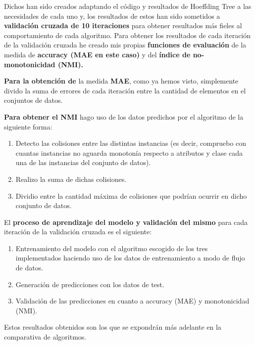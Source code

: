 Dichos han sido creados adaptando el código y resultados de Hoeffding Tree a las necesidades de cada uno y, los resultados de estos han sido sometidos a\textbf{ validación cruzada de 10 iteraciones} para obtener resultados más fieles al comportamiento de cada algoritmo. Para obtener los resultados de cada iteración de la validación cruzada he creado mis propias\textbf{ funciones de evaluación} de la medida de \textbf{accuracy (MAE en este caso)} y del \textbf{índice de no-monotonicidad (NMI).}

\textbf{Para la obtención de} la medida \textbf{MAE}, como ya hemos visto, simplemente divido la suma de errores de cada iteración entre la cantidad de elementos en el conjuntos de datos. 

\textbf{Para obtener el NMI} hago uso de los datos predichos por el algoritmo de la siguiente forma:
\begin{enumerate}
	\item Detecto las colisiones entre las distintas instancias (es decir, compruebo con cuantas instancias no aguarda monotonía respecto a atributos y clase cada una de las instancias del conjunto de datos).
	\item Realizo la suma de dichas colisiones.
	\item Dividio entre la cantidad máxima de colisiones que podrían ocurrir en dicho conjunto de datos.
\end{enumerate}

El \textbf{proceso de aprendizaje del modelo y validación del mismo} para cada iteración de la validación cruzada es el siguiente:
\begin{enumerate}
	\item Entrenamiento del modelo con el algoritmo escogido de los tres implementados haciendo uso de los datos de entrenamiento a modo de flujo de datos.
	\item Generación de predicciones con los datos de test.
	\item Validación de las predicciones en cuanto a accuracy (MAE) y monotonicidad (NMI).
\end{enumerate}

Estos resultados obtenidos son los que se expondrán más adelante en la comparativa de algoritmos.

\newpage


